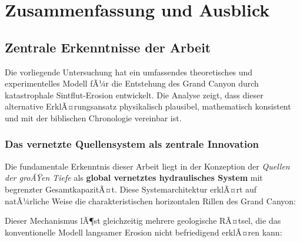 ﻿\documentclass[12pt,a4paper]{report}
\begin{document}
\chapter{Zusammenfassung und Ausblick}

\section{Zentrale Erkenntnisse der Arbeit}

Die vorliegende Untersuchung hat ein umfassendes theoretisches und experimentelles Modell fÃ¼r die Entstehung des Grand Canyon durch katastrophale Sintflut-Erosion entwickelt. Die Analyse zeigt, dass dieser alternative ErklÃ¤rungsansatz physikalisch plausibel, mathematisch konsistent und mit der biblischen Chronologie vereinbar ist.

\subsection{Das vernetzte Quellensystem als zentrale Innovation}

Die fundamentale Erkenntnis dieser Arbeit liegt in der Konzeption der \textit{Quellen der groÃŸen Tiefe} als \textbf{global vernetztes hydraulisches System} mit begrenzter GesamtkapazitÃ¤t. Diese Systemarchitektur erklÃ¤rt auf natÃ¼rliche Weise die charakteristischen horizontalen Rillen des Grand Canyon:

\begin{center}
\end{center}

Dieser Mechanismus lÃ¶st gleichzeitig mehrere geologische RÃ¤tsel, die das konventionelle Modell langsamer Erosion nicht befriedigend erklÃ¤ren kann:
\end{document}
